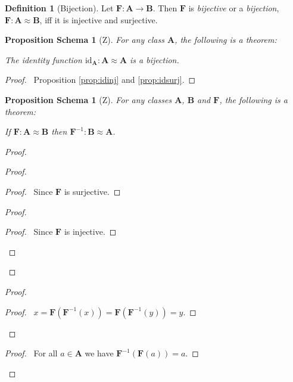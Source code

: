\documentclass{book}
\let\qed\relax
\newtheorem{props}[ax]{Proposition Schema}
\theoremstyle{definition}
\newtheorem{df}[ax]{Definition}
\newcommand{\id}[1]{\ensuremath{\mathrm{id}_{#1}}}
\begin{document}
\begin{df}[Bijection]
Let $\mathbf{F} : \mathbf{A} \rightarrow \mathbf{B}$. Then $\mathbf{F}$ is \emph{bijective} or a \emph{bijection}, $\mathbf{F} : \mathbf{A} \approx \mathbf{B}$, iff it is injective and surjective.
\end{df}

\begin{props}[Z]
\label{prop:idbij}
For any class $\mathbf{A}$, the following is a theorem:

The identity function $\id{\mathbf{A}} : \mathbf{A} \approx \mathbf{A}$ is a bijection.
\end{props}

\begin{proof}
\pf\ Proposition \ref{prop:idinj} and \ref{prop:idsurj}. \qed	
\end{proof}

\begin{props}[Z]
\label{prop:invbij}
For any classes $\mathbf{A}$, $\mathbf{B}$ and $\mathbf{F}$, the following is a theorem:

If $\mathbf{F} : \mathbf{A} \approx \mathbf{B}$ then $\mathbf{F}^{-1} : \mathbf{B} \approx \mathbf{A}$.
\end{props}

\begin{proof}
\pf
{}
\begin{proof}
	\begin{proof}
		\pf\ Since $\mathbf{F}$ is surjective.
	\end{proof}
	\begin{proof}
		\begin{proof}
			\pf\ Since $\mathbf{F}$ is injective.
		\end{proof}
	\end{proof}
\end{proof}
\begin{proof}
	\begin{proof}
		\pf\ $x = \mathbf{F}(\mathbf{F}^{-1}(x)) = \mathbf{F}(\mathbf{F}^{-1}(y)) = y$.
	\end{proof}
\end{proof}
\begin{proof}
	\pf\ For all $a \in \mathbf{A}$ we have $\mathbf{F}^{-1}(\mathbf{F}(a)) = a$.
\end{proof}
\qed
\end{proof}
\end{document}
